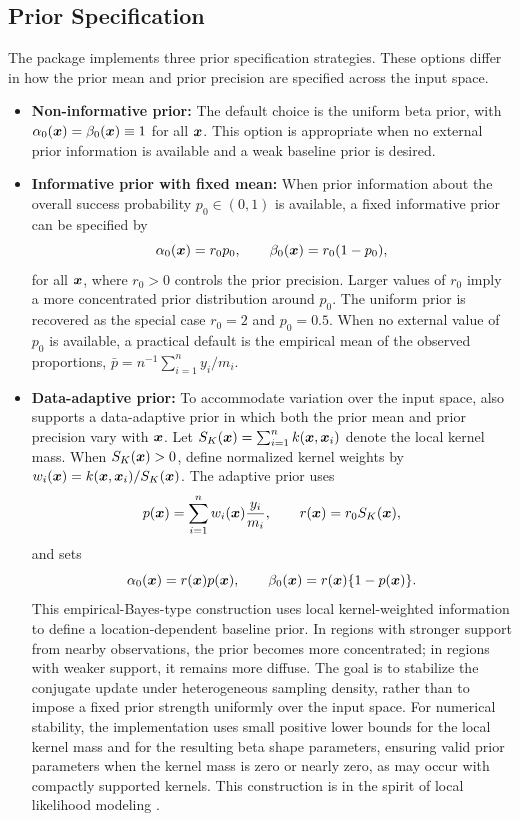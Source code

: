 \documentclass[article, shortnames]{jss}
\renewcommand{\vec}[1]{\mbox{\boldmath ${#1}$}}
\begin{document}
\subsection{Prior Specification}\label{sec:prior}

The  package implements three prior specification strategies. 
These options differ in how the prior mean and prior precision are specified across the input space.

\begin{itemize}
	\item \textbf{Non-informative prior:}  
	The default choice is the uniform beta prior, with $\alpha_0(\vec{x})=\beta_0(\vec{x})\equiv 1$ for all $\vec{x}$. 
	This option is appropriate when no external prior information is available and a weak baseline prior is desired.
	
	\item \textbf{Informative prior with fixed mean:}  
	When prior information about the overall success probability $p_0\in(0,1)$ is available, a fixed informative prior can be specified by
	\[
	\alpha_0(\vec{x}) = r_0p_0,
	\qquad
	\beta_0(\vec{x}) = r_0(1-p_0),
	\]
	for all $\vec{x}$, where $r_0>0$ controls the prior precision. 
	Larger values of $r_0$ imply a more concentrated prior distribution around $p_0$. 
	The uniform prior is recovered as the special case $r_0=2$ and $p_0=0.5$. 
	When no external value of $p_0$ is available, a practical default is the empirical mean of the observed proportions, $\bar{p}=n^{-1}\sum_{i=1}^n y_i/m_i$.
	
	\item \textbf{Data-adaptive prior:}  
	To accommodate variation over the input space,  also supports a data-adaptive prior in which both the prior mean and prior precision vary with $\vec{x}$. 
	Let $S_K(\vec{x})=\sum_{i=1}^n k(\vec{x},\vec{x}_i)$ denote the local kernel mass. 
	When $S_K(\vec{x})>0$, define normalized kernel weights by $w_i(\vec{x})=k(\vec{x},\vec{x}_i)/S_K(\vec{x})$. 
	The adaptive prior uses
	\[
	p(\vec{x}) = \sum_{i=1}^n w_i(\vec{x})\frac{y_i}{m_i},
	\qquad
	r(\vec{x}) = r_0 S_K(\vec{x}),
	\]
	and sets
	\[
	\alpha_0(\vec{x}) = r(\vec{x})p(\vec{x}),
	\qquad
	\beta_0(\vec{x}) = r(\vec{x})\{1-p(\vec{x})\}.
	\]
	This empirical-Bayes-type construction uses local kernel-weighted information to define a location-dependent baseline prior. 
	In regions with stronger support from nearby observations, the prior becomes more concentrated; in regions with weaker support, it remains more diffuse. 
	The goal is to stabilize the conjugate update under heterogeneous sampling density, rather than to impose a fixed prior strength uniformly over the input space. 
	For numerical stability, the implementation uses small positive lower bounds for the local kernel mass and for the resulting beta shape parameters, ensuring valid prior parameters when the kernel mass is zero or nearly zero, as may occur with compactly supported kernels. 
	This construction is in the spirit of local likelihood modeling \citep{Fan1996LocalModel}.
\end{itemize}
\end{document}
